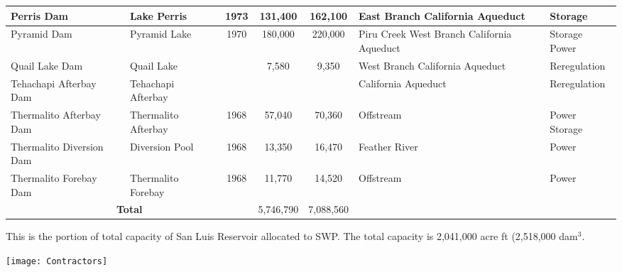 \documentclass{article}
\begin{document}
\begin{table}[!ht]
\begin{tabular}{|p{3cm}|p{3cm}|c|c|c|p{3cm}|p{3cm}|}
        Perris Dam & Lake Perris & 1973 & 131,400 & 162,100 & East Branch California Aqueduct & Storage  \\ \hline
        Pyramid Dam & Pyramid Lake & 1970 & 180,000 & 220,000 & Piru Creek West Branch California Aqueduct & Storage Power\\ \hline
        Quail Lake Dam & Quail Lake & ~ & 7,580 & 9,350 & West Branch California Aqueduct & Reregulation  \\ \hline
        Tehachapi Afterbay Dam & Tehachapi Afterbay & ~ & ~ & ~ & California Aqueduct & Reregulation  \\ \hline
        Thermalito Afterbay Dam & Thermalito Afterbay & 1968 & 57,040 & 70,360 & Offstream & Power Storage \\ \hline
        Thermalito Diversion Dam & Diversion Pool & 1968 & 13,350 & 16,470 & Feather River & Power  \\ \hline
        Thermalito Forebay Dam & Thermalito Forebay & 1968 & 11,770 & 14,520 & Offstream & Power  \\ \hline
       \multicolumn{3}{|c|}{\textbf{Total}} & 5,746,790 & 7,088,560 & ~ &   \\ \hline
    \end{tabular}
\end{table}
This is the portion of total capacity of San Luis Reservoir allocated to SWP.  The total capacity is 2,041,000 acre ft (2,518,000 dam$^3$.



\newpage


\begin{center}
\texttt{[image: Contractors]}
\end{center}
\end{document}
